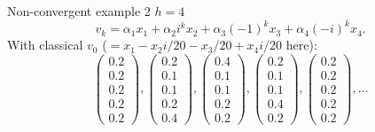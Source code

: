 \documentclass[10pt]{beamer}
\begin{document}
\begin{frame}[allowframebreaks]{Non-convergent example 2}
  $h=4$
  \[
    v_k = \alpha_1 x_1 + \alpha_2 i^k x_2 + \alpha_3 (-1)^k x_3 + \alpha_4 (-i)^k x_4.
  \]
  With classical $v_0$ ($= x_1-x_2i/20-x_3/20+x_4i/20$ here):
  \[
    \begin{pmatrix}
      0.2\\
      0.2\\
      0.2\\
      0.2\\
      0.2
    \end{pmatrix},
    \begin{pmatrix}
      0.2\\
      0.1\\
      0.1\\
      0.2\\
      0.4
    \end{pmatrix},
    \begin{pmatrix}
      0.4\\
      0.1\\
      0.1\\
      0.2\\
      0.2
    \end{pmatrix},
    \begin{pmatrix}
      0.2\\
      0.1\\
      0.1\\
      0.4\\
      0.2
    \end{pmatrix},
    \begin{pmatrix}
      0.2\\
      0.2\\
      0.2\\
      0.2\\
      0.2
    \end{pmatrix}
    ,\ldots
  \]

\end{frame}
\end{document}
